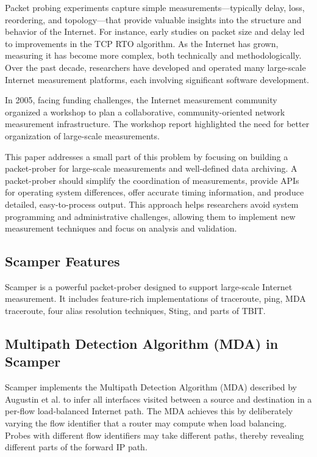 \documentclass[12pt]{cwru_thesis}
\begin{document}
Packet probing experiments capture simple measurements—typically delay, loss, reordering, and topology—that provide valuable insights into the structure and behavior of the Internet. For instance, early studies on packet size and delay led to improvements in the TCP RTO algorithm. As the Internet has grown, measuring it has become more complex, both technically and methodologically. Over the past decade, researchers have developed and operated many large-scale Internet measurement platforms, each involving significant software development.

In 2005, facing funding challenges, the Internet measurement community organized a workshop to plan a collaborative, community-oriented network measurement infrastructure. The workshop report highlighted the need for better organization of large-scale measurements.

This paper addresses a small part of this problem by focusing on building a packet-prober for large-scale measurements and well-defined data archiving. A packet-prober should simplify the coordination of measurements, provide APIs for operating system differences, offer accurate timing information, and produce detailed, easy-to-process output. This approach helps researchers avoid system programming and administrative challenges, allowing them to implement new measurement techniques and focus on analysis and validation.

\newpage
\subsection{Scamper Features}

Scamper is a powerful packet-prober designed to support large-scale Internet measurement. It includes feature-rich implementations of traceroute, ping, MDA traceroute, four alias resolution techniques, Sting, and parts of TBIT.

\subsection{Multipath Detection Algorithm (MDA) in Scamper}

Scamper implements the Multipath Detection Algorithm (MDA) described by Augustin et al. to infer all interfaces visited between a source and destination in a per-flow load-balanced Internet path. The MDA achieves this by deliberately varying the flow identifier that a router may compute when load balancing. Probes with different flow identifiers may take different paths, thereby revealing different parts of the forward IP path.
\end{document}
